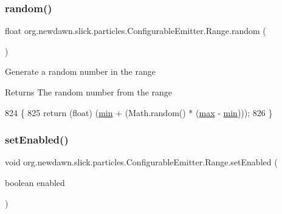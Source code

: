 \subsubsection{\texorpdfstring{random()}{random()}}
{\footnotesize\ttfamily float org.\+newdawn.\+slick.\+particles.\+Configurable\+Emitter.\+Range.\+random (\begin{DoxyParamCaption}{ }\end{DoxyParamCaption})\hspace{0.3cm}{\ttfamily [inline]}}

Generate a random number in the range

\begin{DoxyReturn}{Returns}
The random number from the range 
\end{DoxyReturn}

\begin{DoxyCode}
824                               \{
825             \textcolor{keywordflow}{return} (\textcolor{keywordtype}{float}) (\mbox{\hyperlink{classorg_1_1newdawn_1_1slick_1_1particles_1_1_configurable_emitter_1_1_range_a863382f93996d8d07cea741bea1fb9a9}{min}} + (Math.random() * (\mbox{\hyperlink{classorg_1_1newdawn_1_1slick_1_1particles_1_1_configurable_emitter_1_1_range_a6950c49934d7424d5ab449b3b3256ec0}{max}} - \mbox{\hyperlink{classorg_1_1newdawn_1_1slick_1_1particles_1_1_configurable_emitter_1_1_range_a863382f93996d8d07cea741bea1fb9a9}{min}})));
826         \}
\end{DoxyCode}
\mbox{\label{classorg_1_1newdawn_1_1slick_1_1particles_1_1_configurable_emitter_1_1_range_a29a67c672c6a5d4452aff4d71a5286d9}} 
\subsubsection{\texorpdfstring{set\+Enabled()}{setEnabled()}}
{\footnotesize\ttfamily void org.\+newdawn.\+slick.\+particles.\+Configurable\+Emitter.\+Range.\+set\+Enabled (\begin{DoxyParamCaption}\item[{boolean}]{enabled }\end{DoxyParamCaption})\hspace{0.3cm}{\ttfamily [inline]}}


